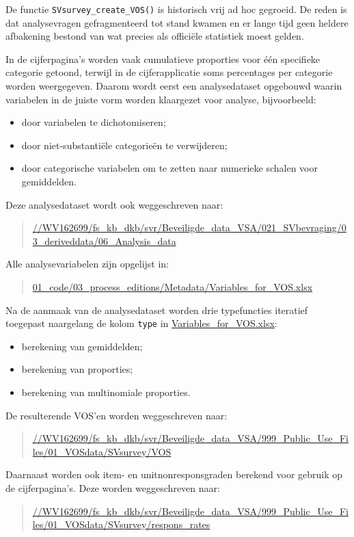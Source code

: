 \documentclass{VSAnote}
\begin{document}
De functie \verb+SVsurvey_create_VOS()+ is historisch vrij ad hoc gegroeid. De reden is dat analysevragen gefragmenteerd tot stand kwamen en er lange tijd geen heldere afbakening bestond van wat precies als officiële statistiek moest gelden.

In de cijferpagina's worden vaak cumulatieve proporties voor één specifieke categorie getoond, terwijl in de cijferapplicatie soms percentages per categorie worden weergegeven. Daarom wordt eerst een analysedataset opgebouwd waarin variabelen in de juiste vorm worden klaargezet voor analyse, bijvoorbeeld:
\begin{itemize}[nosep]
\item door variabelen te dichotomiseren;
\item door niet-substantiële categorieën te verwijderen;
\item door categorische variabelen om te zetten naar numerieke schalen voor gemiddelden.
\end{itemize}

Deze analysedataset wordt ook weggeschreven naar:
\begin{quote}
\url{//WV162699/fs_kb_dkb/svr/Beveiligde_data_VSA/021_SVbevraging/03_deriveddata/06_Analysis_data}
\end{quote}

Alle analysevariabelen zijn opgelijst in:
\begin{quote}
\url{01_code/03_process_editions/Metadata/Variables_for_VOS.xlsx}
\end{quote}

Na de aanmaak van de analysedataset worden drie typefuncties iteratief toegepast naargelang de kolom \verb+type+ in \url{Variables_for_VOS.xlsx}:
\begin{itemize}[nosep]
\item berekening van gemiddelden;
\item berekening van proporties;
\item berekening van multinomiale proporties.
\end{itemize}

De resulterende VOS'en worden weggeschreven naar:
\begin{quote}
\url{//WV162699/fs_kb_dkb/svr/Beveiligde_data_VSA/999_Public_Use_Files/01_VOSdata/SVsurvey/VOS}
\end{quote}

Daarnaast worden ook item- en unitnonresponsgraden berekend voor gebruik op de cijferpagina's. Deze worden weggeschreven naar:
\begin{quote}
\url{//WV162699/fs_kb_dkb/svr/Beveiligde_data_VSA/999_Public_Use_Files/01_VOSdata/SVsurvey/respons_rates}
\end{quote}
\end{document}
